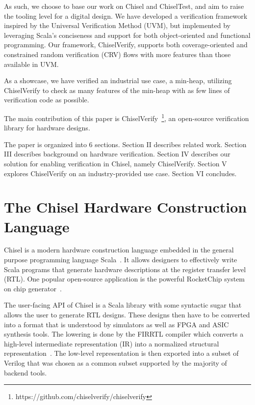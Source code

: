 \documentclass[conference]{IEEEtran}
\begin{document}
As such, we choose to base our work on Chisel and ChiselTest, and aim to raise %
the tooling level for a digital design. We have developed a verification framework %
inspired by the Universal Verification Method (UVM), but implemented by leveraging %
Scala's conciseness and support for both object-oriented and functional programming. %
Our framework, ChiselVerify, supports both coverage-oriented and constrained %
random verification (CRV) flows with more features than those available in UVM. %

As a showcase, we have verified an industrial use case, a min-heap, utilizing 
ChiselVerify to check as many features of the min-heap with as few lines of 
verification code as possible.

The main contribution of this paper is ChiselVerify~\footnote{https://github.com/chiselverify/chiselverify}, an open-source verification library for hardware designs.

The paper is organized into 6 sections.
Section II describes related work.
Section III describes background on hardware verification.
Section IV describes our solution for enabling verification in Chisel, namely ChiselVerify.
Section V explores ChiselVerify on an industry-provided use case.
Section VI concludes.

\section{The Chisel Hardware Construction Language}\label{sec:chisel}

Chisel is a modern hardware construction language embedded in the general purpose programming language Scala~\cite{bachrach2012chisel}.
It allows designers to effectively write Scala programs that generate hardware descriptions at the register transfer level (RTL).
One popular open-source application is the powerful RocketChip system on chip generator~\cite{rocketchip}.

The user-facing API of Chisel is a Scala library with some syntactic sugar that allows the user to generate RTL designs.
These designs then have to be converted into a format that is understood by simulators as well as FPGA and ASIC synthesis tools.
The lowering is done by the FIRRTL compiler which converts a high-level intermediate representation (IR) into a normalized structural representation~\cite{izraelevitz2017firrtl}.
The low-level representation is then exported into a subset of Verilog that was chosen as a common subset supported by the majority of backend tools.
\end{document}
